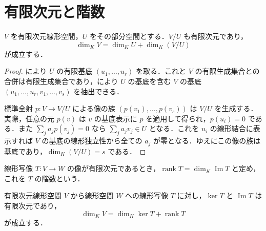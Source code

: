 \section{有限次元と階数}
\begin{prop}[商空間の次元公式]
$V$ を有限次元線形空間，$U$ をその部分空間とする．$V/U$ も有限次元であり，
\[
 \dim_K V=\dim_K U+\dim_K(V/U)
\]
が成立する．
\end{prop}
\begin{proof}
により $U$ の有限基底 $(u_1,\ldots,u_r)$ を取る．これと $V$ の有限生成集合との合併は有限生成集合であり，により $U$ の基底を含む $V$ の基底 $(u_1,\ldots,u_r,v_1,\ldots,v_s)$ を抽出できる．

標準全射 $p:V\to V/U$ による像の族 $(p(v_1),\ldots,p(v_s))$ は $V/U$ を生成する．実際，任意の元 $p(v)$ は $v$ の基底表示に $p$ を適用して得られ，$p(u_i)=0$ である．また $\sum_j a_jp(v_j)=0$ なら $\sum_j a_jv_j\in U$ となる．これを $u_i$ の線形結合に表示すれば $V$ の基底の線形独立性から全ての $a_j$ が零となる．ゆえにこの像の族は基底であり，$\dim_K(V/U)=s$ である．
\end{proof}
\begin{defn}[線形写像の階数]
線形写像 $T:V\to W$ の像が有限次元であるとき，$\operatorname{rank}T=\dim_K\operatorname{Im}T$ と定め，これを $T$ の階数という．
\end{defn}
\begin{prop}[線形写像の次元公式]
有限次元線形空間 $V$ から線形空間 $W$ への線形写像 $T$ に対し，$\ker T$ と $\operatorname{Im}T$ は有限次元であり，
\[
 \dim_K V=\dim_K\ker T+\operatorname{rank}T
\]
が成立する．
\end{prop}

